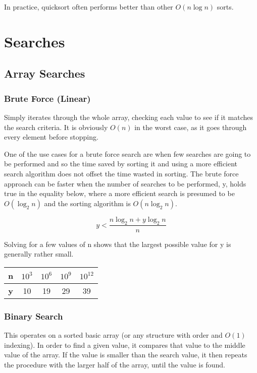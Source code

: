 \documentclass[]{article}
\begin{document}
In practice, quicksort often performs better than other $O(n\log{n})$ sorts.

\pagebreak

\section{Searches}

\subsection{Array Searches}

\subsubsection{Brute Force (Linear)}

Simply iterates through the whole array, checking each value to see if it matches the search criteria. It is obviously $O(n)$ in the worst case, as it goes through every element before stopping.

One of the use cases for a brute force search are when few searches are going to be performed and so the time saved by sorting it and using a more efficient search algorithm does not offset the time wasted in sorting. The brute force approach can be faster when the number of searches to be performed, y, holds true in the equality below, where a more efficient search is presumed to be $O(\log_{2}{n})$ and the sorting algorithm is $O(n\log_{2}{n})$.

\[y < \frac{n\log_{2}{n} + y\log_{2}{n}}{n}\]

Solving for a few values of n shows that the largest possible value for y is generally rather small.

\begin{table}[h]
	\centering
\begin{tabular}{|c|c|c|c|c|}
	\hline \textbf {n} & $10^3$ & $10^6$ & $10^9$ & $10^{12}$ \\
	\hline \textbf{y} & 10 & 19 & 29 & 39 \\
	\hline 
\end{tabular}
\end{table}

\subsubsection{Binary Search}

This operates on a sorted basic array (or any structure with order and $O(1)$ indexing). In order to find a given value, it compares that value to the middle value of the array. If the value is smaller than the search value, it then repeats the procedure with the larger half of the array, until the value is found.
\end{document}
